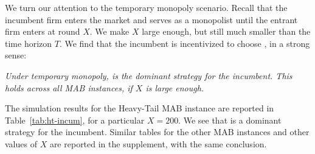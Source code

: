 \documentclass[../competing_bandits_with_appendix.tex]{subfiles}
\begin{document}
We turn our attention to the temporary monopoly scenario. Recall that the incumbent firm enters the market and serves as a monopolist until the entrant firm enters at round $X$. We make $X$ large enough, but still much smaller than the time horizon $T$. We find that the incumbent is incentivized to choose \TS, in a strong sense:

\begin{finding}\label{find:temp-monopoly}
\textit{Under temporary monopoly, \TS is the dominant strategy for the incumbent. This holds across all MAB instances, if $X$ is large enough.
}
\end{finding}

The simulation results for the Heavy-Tail MAB instance are reported in Table~\ref{tab:ht-incum}, for a particular $X=200$. We see that \TS is a dominant strategy for the incumbent. Similar tables for the other MAB instances and other values of $X$ are reported in the supplement, with the same conclusion.
\end{document}
